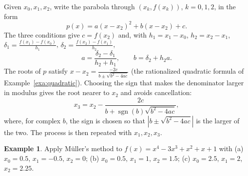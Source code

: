 \documentclass[11pt,a4paper]{article}
\numberwithin{equation}{section}
\DeclareMathOperator{\sgn}{sgn}
\theoremstyle{definition}
\newtheorem{exa}[thm]{Example}
\begin{document}
Given $x_0, x_1, x_2$, write the parabola through $(x_k,f(x_k))$, $k = 0,1,2$, in the form
$$p(x) = a(x-x_2)^2+b(x-x_2)+c .$$
The three conditions give $c = f(x_2)$ and, with $h_1 = x_1-x_0$, $h_2 = x_2-x_1$, $\delta_1 = \frac{f(x_1)-f(x_0)}{h_1}$, $\delta_2 = \frac{f(x_2)-f(x_1)}{h_2}$,
$$a = \frac{\delta_2-\delta_1}{h_2+h_1},\qquad b = \delta_2+h_2a .$$
The roots of $p$ satisfy $x-x_2 = \frac{-2c}{b\pm\sqrt{b^2-4ac}}$ (the rationalized quadratic formula of Example~\ref{exa:quadratic}).
Choosing the sign that makes the denominator larger in modulus gives the root nearer to $x_2$ and avoids cancellation:
\begin{equation}\label{eq:muller}
x_3 = x_2-\frac{2c}{b+\sgn(b)\sqrt{b^2-4ac}},
\end{equation}
where, for complex $b$, the sign is chosen so that $|b\pm\sqrt{b^2-4ac}|$ is the larger of the two. The process is then repeated with
$x_1, x_2, x_3$.

\begin{exa}
\label{exa:muller}
Apply M\"uller's method to $f(x) = x^4-3x^3+x^2+x+1$ with (a) $x_0 = 0.5$, $x_1 = -0.5$, $x_2 = 0$; (b) $x_0 = 0.5$, $x_1 = 1$, $x_2 = 1.5$;
(c) $x_0 = 2.5$, $x_1 = 2$, $x_2 = 2.25$.
\end{exa}
\end{document}
